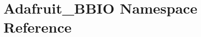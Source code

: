 \hypertarget{namespaceAdafruit__BBIO}{}\section{Adafruit\+\_\+\+B\+B\+I\+O Namespace Reference}
\label{namespaceAdafruit__BBIO}
